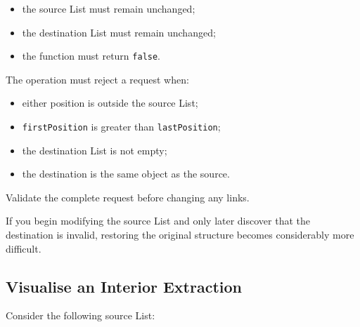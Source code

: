 \documentclass{csc2059practical}
\begin{document}
\begin{itemize}
    \item the source List must remain unchanged;
    \item the destination List must remain unchanged;
    \item the function must return \texttt{false}.
\end{itemize}

The operation must reject a request when:

\begin{itemize}
    \item either position is outside the source List;
    \item \texttt{firstPosition} is greater than
          \texttt{lastPosition};
    \item the destination List is not empty;
    \item the destination is the same object as the source.
\end{itemize}

\begin{tipbox}
Validate the complete request before changing any links.

If you begin modifying the source List and only later discover that the destination is invalid, restoring the original structure becomes considerably more difficult.
\end{tipbox}


\subsection{Visualise an Interior Extraction}

Consider the following source List:
\end{document}

